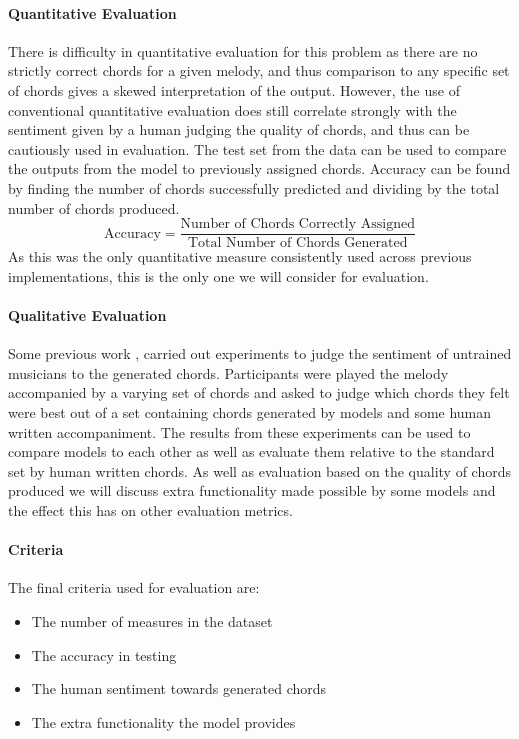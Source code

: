 \paragraph{Quantitative Evaluation}
There is difficulty in quantitative evaluation for this problem as there are no strictly correct chords for a given melody, and thus comparison to any specific set of chords gives a skewed interpretation of the output.
However, the use of conventional quantitative evaluation does still correlate strongly with the sentiment given by a human judging the quality of chords, and thus can be cautiously used in evaluation.
The test set from the data can be used to compare the outputs from the model to previously assigned chords. Accuracy can be found by finding the number of chords successfully predicted and dividing by the total number of chords produced.
\begin{equation}
    \text{Accuracy} = \frac{\text{Number of Chords Correctly Assigned}}{\text{Total Number of Chords Generated}}
\end{equation}
As this was the only quantitative measure consistently used across previous implementations, this is the only one we will consider for evaluation.

\paragraph{Qualitative Evaluation}
Some previous work ,  carried out experiments to judge the sentiment of untrained musicians to the generated chords.
Participants were played the melody accompanied by a varying set of chords and asked to judge which chords they felt were best out of a set containing chords generated by models and some human written accompaniment.
The results from these experiments can be used to compare models to each other as well as evaluate them relative to the standard set by human written chords.
As well as evaluation based on the quality of chords produced we will discuss extra functionality made possible by some models and the effect this has on other evaluation metrics.

\paragraph{Criteria}
The final criteria used for evaluation are:
\begin{itemize}
    \item The number of measures in the dataset
    \item The accuracy in testing
    \item The human sentiment towards generated chords
    \item The extra functionality the model provides
\end{itemize}

